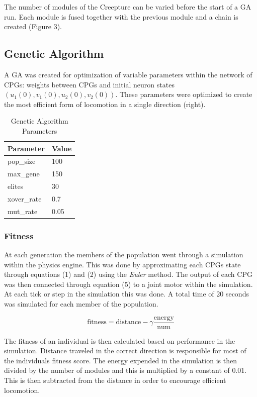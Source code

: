\documentclass{acm_proc_article-sp}
\begin{document}
The number of modules of the Creepture can be varied before the start of
a GA run. Each module is fused together with the previous module and a
chain is created (Figure 3).

\subsection{Genetic Algorithm}\label{genetic-algorithm}

A GA was created for optimization of variable parameters within the
network of CPGs: weights between CPGs and initial neuron states
$(u_1(0), v_1(0), u_2(0), v_2(0))$. These parameters were optimized to
create the most efficient form of locomotion in a single direction
(right).

\begin{table}
\centering
\caption{Genetic Algorithm Parameters}
\begin{tabular}{|l|l|} \hline
Parameter & Value\\ \hline
pop\_size & 100\\ \hline
max\_gene & 150\\ \hline
elites & 30\\ \hline
xover\_rate & 0.7\\ \hline
mut\_rate & 0.05\\ \hline
\end{tabular}
\end{table}

\subsubsection{Fitness}

At each generation the members of the population went through a
simulation within the physics engine. This was done by approximating
each CPGs state through equations (1) and (2) using the \emph{Euler}
method. The output of each CPG was then connected through equation (5)
to a joint motor within the simulation. At each tick or step in the
simulation this was done. A total time of 20 seconds was simulated for
each member of the population.

\begin{equation}
    \text{fitness} = \text{distance} - \gamma \frac{\text{energy}}{\text{num}}
\end{equation}

The fitness of an individual is then calculated based on performance in
the simulation. Distance traveled in the correct direction is
responsible for most of the individuals fitness score. The energy
expended in the simulation is then divided by the number of modules and
this is multiplied by a constant of 0.01. This is then subtracted from
the distance in order to encourage efficient locomotion.
\end{document}
